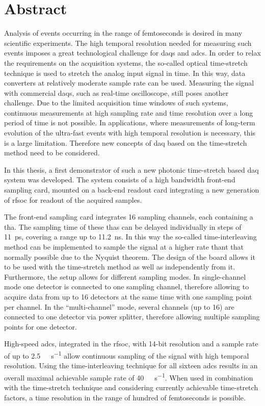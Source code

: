 \chapter*{Abstract}

Analysis of events occurring in the range of femtoseconds is desired in many scientific experiments.
The high temporal resolution needed for measuring such events imposes a great technological challenge for \glspl{daq} and \glspl{adc}.
In order to relax the requirements on the acquisition systems, the so-called optical time-stretch technique is used to stretch the analog input signal in time.
In this way, data converters at relatively moderate sample rate can be used.
Measuring the signal with commercial \glspl{daq}, such as real-time oscilloscope, still poses another challenge.
Due to the limited acquisition time windows of such systems, continuous measurements at high sampling rate and time resolution over a long period of time is not possible.
In applications, where measurements of long-term evolution of the ultra-fast events with high temporal resolution is necessary, this is a large limitation.
Therefore new concepts of \gls{daq} based on the time-stretch method need to be considered.

In this thesis, a first demonstrator of such a new photonic time-stretch based \gls{daq} system was developed.
The system consists of a high bandwidth front-end sampling card, mounted on a back-end readout card integrating a new generation of \gls{rfsoc} for readout of the acquired samples. 

The front-end sampling card integrates 16 sampling channels, each containing a \gls{tha}. 
The sampling time of these \glspl{tha} can be delayed individually in steps of \SI{11}{\pico \second}, covering a range up to \SI{11.2}{\nano \second}.
In this way the so-called time-interleaving method can be implemented to sample the signal at a higher rate thant that normally possible due to the Nyquist theorem.
The design of the board allows it to be used with the time-stretch method as well as independently from it.
Furthermore, the setup allows for different sampling modes.
In single-channel mode one detector is connected to one sampling channel, therefore allowing to acquire data from up to 16 detectors at the same time with one sampling point per channel.
In the ``multi-channel'' mode, several channels (up to 16) are connected to one detector via power splitter, therefore allowing multiple sampling points for one detector.

High-speed \glspl{adc}, integrated in the \gls{rfsoc}, with 14-bit resolution and a sample rate of up to \SI{2.5}{\giga \sample \per \second} allow continuous sampling of the signal with high temporal resolution. 
Using the time-interleaving technique for all sixteen \glspl{adc} results in an overall maximal achievable sample rate of \SI{40}{\giga \sample \per \second}.  
When used in combination with the time-stretch technique and considering currently achievable time-stretch factors, a time resolution in the range of hundred of femtoseconds is possible.

